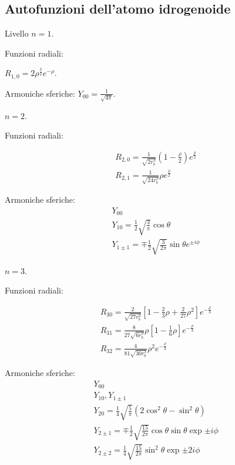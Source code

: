\documentclass[main.tex]{subfiles}
\begin{document}
\subsection{Autofunzioni dell'atomo idrogenoide}

\begin{enumerate*}
\item Livello $n=1$.

Funzioni radiali:

$R_{1,0}=2\rho^\frac{3}{2}e^{-\rho}$.

Armoniche sferiche:
$Y_{00}=\frac{1}{\sqrt{4\pi}}$.

\item $n=2$.

Funzioni radiali:

\begin{align*}
&R_{2,0}=\frac{1}{\sqrt{2r_b^3}}(1-\frac{\rho}{2})e^{\frac{\rho}{2}}\\
&R_{2,1}=\frac{1}{\sqrt{24r_b^3}}\rho e^{\frac{\rho}{2}}
\end{align*}

Armoniche sferiche:
\begin{align*}
&Y_{00} \\
&Y_{10}=\frac{1}{2}\sqrt{\frac{3}{\pi}}\cos{\theta}\\
&Y_{1\pm1}=\mp\frac{1}{2}\sqrt{\frac{3}{2\pi}}\sin{\theta}e^{\pm i\phi}
\end{align*}

\item $n=3$.

Funzioni radiali:

\begin{align*}
&R_{30}=\frac{2}{\sqrt{27r_b^3}}[1-\frac{2}{3}\rho+\frac{2}{27}\rho^2]e^{-\frac{\rho}{3}}\\
&R_{31}=\frac{8}{27\sqrt{6r_b^3}}\rho [1-\frac{1}{6}\rho]e^{-\frac{\rho}{3}}\\
&R_{32}=\frac{4}{81\sqrt{30r_b^3}}\rho^2e^{-\frac{\rho}{3}}
\end{align*}

Armoniche sferiche:
\begin{align*}
&Y_{00}\\
&Y_{10}, Y_{1\pm1}\\
&Y_{20}=\frac{1}{4}\sqrt{\frac{5}{\pi}}(2\cos^2{\theta}-\sin^2{\theta})\\
&Y_{2\pm1}=\mp\frac{1}{2}\sqrt{\frac{15}{2\pi}}\cos{\theta}\sin{\theta}\exp{\pm i\phi }\\
&Y_{2\pm2}=\frac{1}{4}\sqrt{\frac{15}{2\pi}}\sin^2{\theta}\exp{\pm2i\phi}
\end{align*}
\end{enumerate*}
\end{document}
